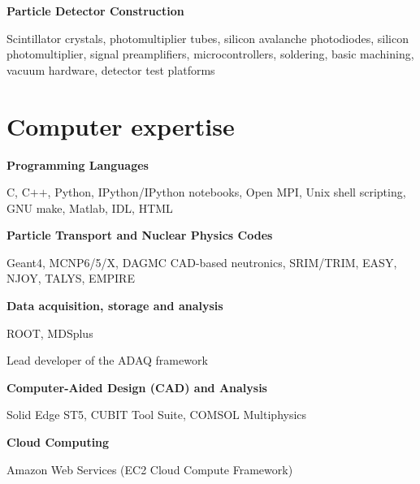 \documentclass[10pt]{article}
\begin{document}
\halfblankline

\textbf{Particle Detector Construction}
\begin{innerlist}
\item Scintillator crystals, photomultiplier tubes, silicon avalanche
  photodiodes, silicon photomultiplier, signal preamplifiers,
  microcontrollers, soldering, basic machining, vacuum hardware,
  detector test platforms
\end{innerlist}

\section{Computer expertise}

\textbf{Programming Languages}
\begin{innerlist}
  \item C, C$+$$+$, Python, IPython/IPython notebooks, Open MPI, Unix shell scripting, GNU make, Matlab, IDL, HTML
\end{innerlist}

\halfblankline

\textbf{Particle Transport and Nuclear Physics Codes}
\begin{innerlist}
  \item Geant4, MCNP6/5/X, DAGMC CAD-based neutronics, SRIM/TRIM, EASY, NJOY, TALYS, EMPIRE
\end{innerlist}

\halfblankline

\textbf{Data acquisition, storage and analysis}
\begin{innerlist}
  \item ROOT, MDSplus
  \item Lead developer of the ADAQ framework
\end{innerlist}

\halfblankline

\textbf{Computer-Aided Design (CAD) and Analysis}
\begin{innerlist}
  \item Solid Edge ST5, CUBIT Tool Suite, COMSOL Multiphysics
\end{innerlist}

\halfblankline

\textbf{Cloud Computing}
\begin{innerlist}
  \item Amazon Web Services (EC2 Cloud Compute Framework)
\end{innerlist}

\halfblankline
\end{document}

